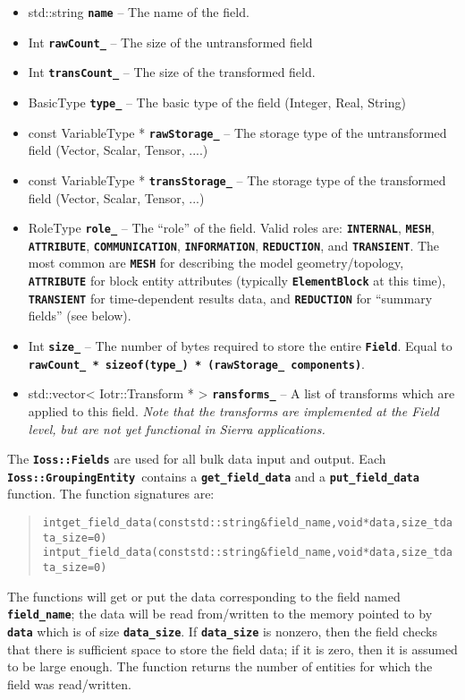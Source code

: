 \documentclass[11pt,twoside]{article}
\newcommand{\code}[1]
   {\mbox{\bf\tt #1}\null}
\newenvironment{source}
{\small\begin{quote}\begin{alltt}}
{\end{alltt}\end{quote}\normalsize}
\begin{document}
\begin{itemize}
\item {
std::string \code{name} -- The name of the field.}
\item {
Int \code{rawCount\_} -- The size of the untransformed
field }
\item {
Int \code{transCount\_} -- The size of the transformed
field.}
\item {
BasicType \code{type\_} -- The basic type of the field
(Integer, Real, String)}
\item {
const VariableType * \code{rawStorage\_} -- The storage
type of the untransformed field (Vector, Scalar, Tensor, ....)}
\item {
const VariableType * \code{transStorage\_} -- The storage
type of the transformed field (Vector, Scalar, Tensor, ...)}
\item {
RoleType \code{role\_} -- The ``role'' of the field. Valid
roles are: \code{INTERNAL}, \code{MESH}, \code{ATTRIBUTE},
\code{COMMUNICATION}, \code{INFORMATION},
\code{REDUCTION}, and \code{TRANSIENT}. The most
common are \code{MESH} for describing the model
geometry/topology, \code{ATTRIBUTE} for block entity attributes
(typically \code{ElementBlock} at this time), \code{TRANSIENT} for time{}-dependent
results data, and \code{REDUCTION} for ``summary fields''
(see below).}
\item {
Int \code{size\_} -- The number of bytes required to store
the entire \code{Field}. Equal to \code{rawCount\_
* sizeof(type\_) * (rawStorage\_ components)}. }
\item {
std::vector{\textless} Iotr::Transform * {\textgreater}
\code{ransforms\_} -- A list of transforms which are
applied to this field. \textit{Note that the transforms are implemented
at the Field level, but are not yet functional in Sierra
applications.}}
\end{itemize}
The \code{Ioss::Fields} are used for all bulk data input and
output. Each \code{Ioss::GroupingEntity }contains a
\code{get\_field\_data} and a
\code{put\_field\_data} function. The function signatures
are:
\begin{source}
int get\_field\_data(const std::string \&field\_name, void *data, size\_t data\_size=0)
int put\_field\_data(const std::string \&field\_name, void *data, size\_t data\_size=0)
\end{source}

The functions will get or put the data corresponding to the field
named \code{field\_name}; the data will be read from/written to the
memory pointed to by \code{data} which is of size \code{data\_size}.
If \code{data\_size} is nonzero, then the field checks that there is
sufficient space to store the field data; if it is zero, then it is
assumed to be large enough.  The function returns the number of
entities for which the field was read/written.
\end{document}
